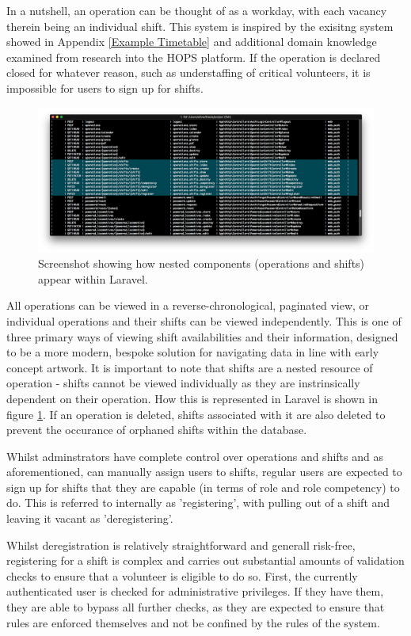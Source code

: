 In a nutshell, an operation can be thought of as a workday, with each vacancy therein being an individual shift. This system is inspired by the exisitng system showed in Appendix \ref{Example Timetable} and additional domain knowledge examined from research into the HOPS platform. \cite{Hops2} If the operation is declared closed for whatever reason, such as understaffing of critical volunteers, it is impossible for users to sign up for shifts.

\begin{figure}[!ht]
    \centering
    \includegraphics[width=1.0\textwidth]{Figures/nested-components}
    \caption{Screenshot showing how nested components (operations and shifts) appear within Laravel.}
    \label{fig:nested}
\end{figure}

All operations can be viewed in a reverse-chronological, paginated view, or individual operations and their shifts can be viewed independently. This is one of three primary ways of viewing shift availabilities and their information, designed to be a more modern, bespoke solution for navigating data in line with early concept artwork. It is important to note that shifts are a nested resource of operation - shifts cannot be viewed individually as they are instrinsically dependent on their operation. How this is represented in Laravel is shown in figure \ref{fig:nested}. If an operation is deleted, shifts associated with it are also deleted to prevent the occurance of orphaned shifts within the database.

Whilst adminstrators have complete control over operations and shifts and as aforementioned, can manually assign users to shifts, regular users are expected to sign up for shifts that they are capable (in terms of role and role competency) to do. This is referred to internally as 'registering', with pulling out of a shift and leaving it vacant as 'deregistering'.

Whilst deregistration is relatively straightforward and generall risk-free, registering for a shift is complex and carries out substantial amounts of validation checks to ensure that a volunteer is eligible to do so. First, the currently authenticated user is checked for administrative privileges. If they have them, they are able to bypass all further checks, as they are expected to ensure that rules are enforced themselves and not be confined by the rules of the system. 

